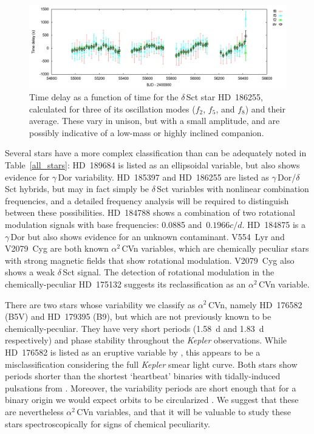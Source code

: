 \documentclass[a4paper,fleqn,usenatbib]{mnras}
\newcommand{\kepler}{\textit{Kepler}\xspace}
\begin{document}
\begin{figure}
\noindent\includegraphics[width=19cm,keepaspectratio]{HD186255_time-delay_plot.png}

\caption{\label{pm}
Time delay as a function of time for the $\delta$\,Sct star HD~186255, calculated for three of its oscillation modes ($f_2$, $f_5$, and $f_8$) and their average. These vary in unison, but with a small amplitude, and are possibly indicative of a low-mass or highly inclined companion.}
\end{figure}

Several stars have a more complex classification than can be adequately noted in Table~\ref{all_stars}: HD~189684 is listed as an ellipsoidal variable, but also shows evidence for $\gamma$\,Dor variability. HD~185397 and HD~186255 are listed as $\gamma$\,Dor/$\delta$\,Sct hybrids, but may in fact simply be $\delta$\,Sct variables with nonlinear combination frequencies, and a detailed frequency analysis will be required to distinguish between these possibilities. HD~184788 shows a combination of two rotational modulation signals with base frequencies: 0.0885 and~$0.1966 c/d$. HD~184875 is a $\gamma$\,Dor but also shows evidence for an unknown contaminant. V554~Lyr and V2079~Cyg are both known $\alpha^2$\,CVn variables, which are chemically peculiar stars with strong magnetic fields that show rotational modulation. V2079~Cyg also shows a weak $\delta$\,Sct signal. The detection of rotational modulation in the chemically-peculiar HD~175132 suggests its reclassification as an $\alpha^2$\,CVn variable. 

There are two stars whose variability we classify as $\alpha^2$\,CVn, namely HD~176582 (B5V) and HD~179395 (B9), but which are not previously known to be chemically-peculiar. They have very short periods (1.58~d and 1.83~d respectively) and phase stability throughout the \kepler observations. While HD~176582 is listed as an eruptive variable by \citet{2016ApJ...829...23D}, this appears to be a misclassification considering the full \kepler smear light curve. Both stars show periods shorter than the shortest `heartbeat' binaries with tidally-induced pulsations from \citet{2012ApJ...753...86T}. Moreover, the variability periods are short enough that for a binary origin we would expect orbits to be circularized \citep{2000A&A...354..881D}. We suggest that these are nevertheless $\alpha^2$\,CVn variables, and that it will be valuable to study these stars spectroscopically for signs of chemical peculiarity.
\end{document}

